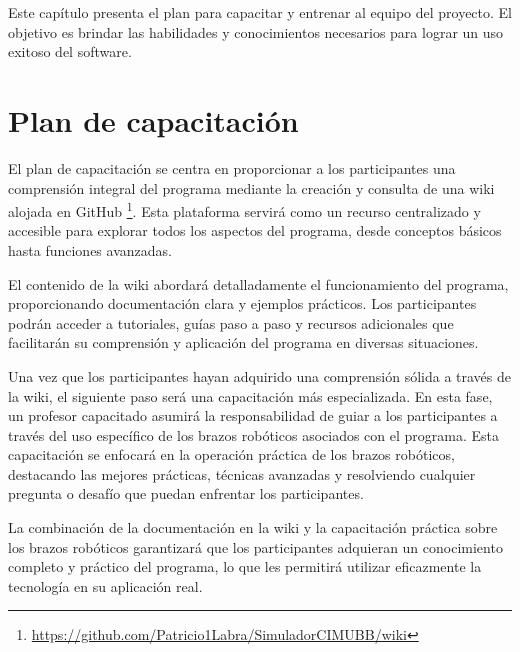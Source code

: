 Este capítulo presenta el plan para capacitar y entrenar al equipo del proyecto. El objetivo es brindar las habilidades y conocimientos necesarios para lograr un uso exitoso del software.
\section{Plan de capacitación}

El plan de capacitación se centra en proporcionar a los participantes una comprensión integral del programa mediante la creación y consulta de una wiki alojada en GitHub \footnote{\url{https://github.com/Patricio1Labra/SimuladorCIMUBB/wiki}}. Esta plataforma servirá como un recurso centralizado y accesible para explorar todos los aspectos del programa, desde conceptos básicos hasta funciones avanzadas.

El contenido de la wiki abordará detalladamente el funcionamiento del programa, proporcionando documentación clara y ejemplos prácticos. Los participantes podrán acceder a tutoriales, guías paso a paso y recursos adicionales que facilitarán su comprensión y aplicación del programa en diversas situaciones.

Una vez que los participantes hayan adquirido una comprensión sólida a través de la wiki, el siguiente paso será una capacitación más especializada. En esta fase, un profesor capacitado asumirá la responsabilidad de guiar a los participantes a través del uso específico de los brazos robóticos asociados con el programa. Esta capacitación se enfocará en la operación práctica de los brazos robóticos, destacando las mejores prácticas, técnicas avanzadas y resolviendo cualquier pregunta o desafío que puedan enfrentar los participantes.

La combinación de la documentación en la wiki y la capacitación práctica sobre los brazos robóticos garantizará que los participantes adquieran un conocimiento completo y práctico del programa, lo que les permitirá utilizar eficazmente la tecnología en su aplicación real.